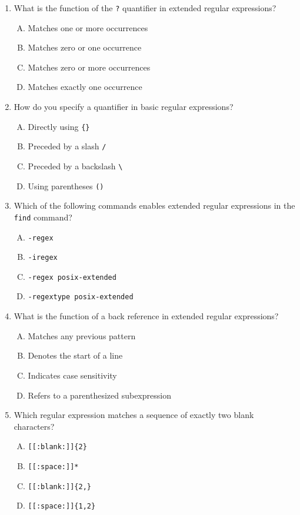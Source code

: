 \documentclass[a4paper]{report}
\begin{document}
\begin{enumerate}[1.]
    \item What is the function of the \texttt{?} quantifier in extended regular expressions?  
    \begin{enumerate}[A)]
        \item Matches one or more occurrences  
        \item Matches zero or one occurrence  
        \item Matches zero or more occurrences  
        \item Matches exactly one occurrence  
    \end{enumerate}

    \item How do you specify a quantifier in basic regular expressions?  
    \begin{enumerate}[A)]
        \item Directly using \texttt{\{\}}  
        \item Preceded by a slash \texttt{/}  
        \item Preceded by a backslash \texttt{\textbackslash}  
        \item Using parentheses \texttt{()}  
    \end{enumerate}

    \item Which of the following commands enables extended regular expressions in the \texttt{find} command?  
    \begin{enumerate}[A)]
        \item \texttt{-regex}  
        \item \texttt{-iregex}  
        \item \texttt{-regex posix-extended}  
        \item \texttt{-regextype posix-extended}  
    \end{enumerate}

    \item What is the function of a back reference in extended regular expressions?  
    \begin{enumerate}[A)]
        \item Matches any previous pattern  
        \item Denotes the start of a line  
        \item Indicates case sensitivity  
        \item Refers to a parenthesized subexpression  
    \end{enumerate}

    \item Which regular expression matches a sequence of exactly two blank characters?  
    \begin{enumerate}[A)]
        \item \texttt{[[:blank:]]\{2\}}  
        \item \texttt{[[:space:]]*}  
        \item \texttt{[[:blank:]]\{2,\}}  
        \item \texttt{[[:space:]]\{1,2\}}  
    \end{enumerate}


\end{enumerate}
\end{document}

